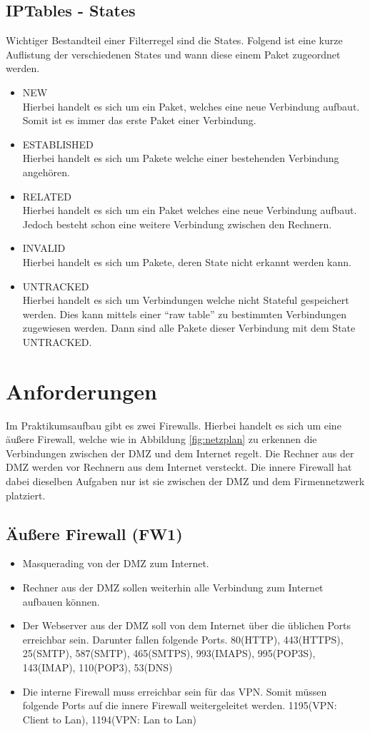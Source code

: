\subsection{IPTables - States}
Wichtiger Bestandteil einer Filterregel sind die States. Folgend ist eine kurze Auflistung der verschiedenen States und wann diese einem Paket zugeordnet werden.
\begin{itemize}
	\item NEW \\
	Hierbei handelt es sich um ein Paket, welches eine neue Verbindung aufbaut. Somit ist es immer das erste Paket einer Verbindung.
	\item ESTABLISHED \\
	Hierbei handelt es sich um Pakete welche einer bestehenden Verbindung angehören.
	\item RELATED \\
	Hierbei handelt es sich um ein Paket welches eine neue Verbindung aufbaut. Jedoch besteht schon eine weitere Verbindung zwischen den Rechnern.
	\item INVALID \\
	Hierbei handelt es sich um Pakete, deren State nicht erkannt werden kann.
	\item UNTRACKED \\
	Hierbei handelt es sich um Verbindungen welche nicht Stateful gespeichert werden. Dies kann mittels einer "`raw table"' zu bestimmten Verbindungen zugewiesen werden. Dann sind alle Pakete dieser Verbindung mit dem State UNTRACKED.
\end{itemize}

\section{Anforderungen}
Im Praktikumsaufbau gibt es zwei Firewalls. Hierbei handelt es sich um eine äußere Firewall, welche wie in Abbildung \ref{fig:netzplan} zu erkennen die Verbindungen zwischen der DMZ und dem Internet regelt. Die Rechner aus der DMZ werden vor Rechnern aus dem Internet versteckt. Die innere Firewall hat dabei dieselben Aufgaben nur ist sie zwischen der DMZ und dem Firmennetzwerk platziert.

\subsection{Äußere Firewall (FW1)}
\begin{itemize}
\item Masquerading von der DMZ zum Internet.
\item Rechner aus der DMZ sollen weiterhin alle Verbindung zum Internet aufbauen können.
\item Der Webserver aus der DMZ soll von dem Internet über die üblichen Ports erreichbar sein. Darunter fallen folgende Ports. 80(HTTP), 443(HTTPS), 25(SMTP), 587(SMTP), 465(SMTPS), 993(IMAPS), 995(POP3S), 143(IMAP), 110(POP3), 53(DNS)
\item Die interne Firewall muss erreichbar sein für das VPN. Somit müssen folgende Ports auf die innere Firewall weitergeleitet werden. 1195(VPN: Client to Lan), 1194(VPN: Lan to Lan)
\end{itemize}

